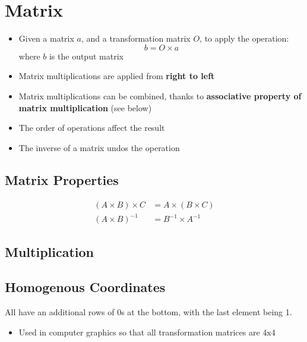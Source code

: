 \chapter{Matrix}

\begin{itemize}
  \item Given a matrix $ a $, and a transformation matrix $ O $, to apply
  the operation:
  \begin{equation}
    b = O \times a
  \end{equation}
  where $ b $ is the output matrix

  \item Matrix multiplications are applied from \textbf{right to left}
  \item Matrix multiplications can be combined, thanks to \textbf{associative
  property of matrix multiplication} (see below)
  \item The order of operations affect the result
  \item The inverse of a matrix undos the operation
\end{itemize}

\section{Matrix Properties}

  \begin{align}
    \left( A \times B \right) \times C &= A \times \left( B \times C \right) \\
    \left( A \times B \right)^{-1} &= B^{-1} \times A^{-1}
  \end{align}

\section{Multiplication}

\section{Homogenous Coordinates}

  All have an additional rows of 0s at the bottom, with the last element
  being 1.

  \begin{itemize}
    \item Used in computer graphics so that all transformation matrices
    are 4x4
  \end{itemize}
